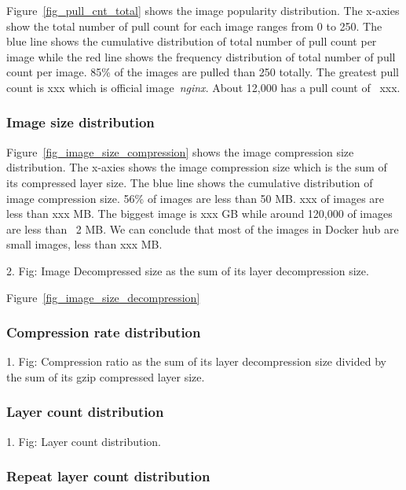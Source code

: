 
Figure~\ref{fig_pull_cnt_total} shows the image popularity distribution. The x-axies show the total number of pull count for each image ranges from 0 to 250. The blue line shows the cumulative distribution of total number of pull count per image while the red line shows the frequency distribution of total number of pull count per image. 85\% of the images are pulled than 250 totally. The greatest pull count is xxx which is official image~\textit{nginx}. About 12,000 has a pull count of ~xxx.

\subsubsection{Image size distribution}

Figure~\ref{fig_image_size_compression} shows the image compression size distribution. The x-axies shows the image compression size which is the sum of its compressed layer size. The blue line shows the cumulative distribution of image compression size. 56\% of images are less than 50 MB. xxx of images are less than xxx MB. The biggest image is xxx GB while around 120,000 of images are less than ~2 MB. We can conclude that most of the images in Docker hub are small images, less than xxx MB.

2. Fig: Image Decompressed size as the sum of its layer decompression size.

Figure~\ref{fig_image_size_decompression}

\subsubsection{Compression rate distribution}

1. Fig: Compression ratio as the sum of its layer decompression size divided by the sum of its gzip compressed layer size.

\subsubsection{Layer count distribution}

1. Fig: Layer count distribution.

\subsubsection{Repeat layer count distribution}

